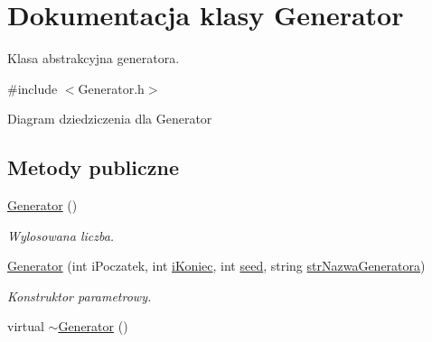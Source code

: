 \hypertarget{classGenerator}{\section{Dokumentacja klasy Generator}
\label{classGenerator}
}


Klasa abstrakcyjna generatora.  




{\ttfamily \#include $<$Generator.\+h$>$}



Diagram dziedziczenia dla Generator
\subsection*{Metody publiczne}
\begin{DoxyCompactItemize}
\item 
\hyperlink{classGenerator_aaaf1e5f3a47ede3ef8a96a301ee04a10}{Generator} ()
\begin{DoxyCompactList}\small\item\em Wylosowana liczba. \end{DoxyCompactList}\item 
\hyperlink{classGenerator_aae31ea3cea1d9b3770b74965b843fcfc}{Generator} (int i\+Poczatek, int \hyperlink{classGenerator_a235b3d02ce62d19e803cc2295eb7911e}{i\+Koniec}, int \hyperlink{classGenerator_ae77446ccb4946b8eb28d0f20f3e4a95f}{seed}, string \hyperlink{classGenerator_a7e2c131c26baf31bb3f072115c619d1c}{str\+Nazwa\+Generatora})
\begin{DoxyCompactList}\small\item\em Konstruktor parametrowy. \end{DoxyCompactList}\item 
\hypertarget{classGenerator_acc85fbe22690003267ba899bacf777d1}{virtual \hyperlink{classGenerator_acc85fbe22690003267ba899bacf777d1}{$\sim$\+Generator} ()}\label{classGenerator_acc85fbe22690003267ba899bacf777d1}


\end{DoxyCompactItemize}
